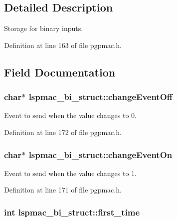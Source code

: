 \subsection{Detailed Description}
Storage for binary inputs. 

Definition at line 163 of file pgpmac.\-h.



\subsection{Field Documentation}
\hypertarget{structlspmac__bi__struct_ae0859842f637694ace0e6d54c0e2af6a}{
\subsubsection[{change\-Event\-Off}]{\setlength{\rightskip}{0pt plus 5cm}char$\ast$ lspmac\-\_\-bi\-\_\-struct\-::change\-Event\-Off}}\label{structlspmac__bi__struct_ae0859842f637694ace0e6d54c0e2af6a}


Event to send when the value changes to 0. 



Definition at line 172 of file pgpmac.\-h.

\hypertarget{structlspmac__bi__struct_ae7178007dfdf21be0e5b1fbaa36732af}{
\subsubsection[{change\-Event\-On}]{\setlength{\rightskip}{0pt plus 5cm}char$\ast$ lspmac\-\_\-bi\-\_\-struct\-::change\-Event\-On}}\label{structlspmac__bi__struct_ae7178007dfdf21be0e5b1fbaa36732af}


Event to send when the value changes to 1. 



Definition at line 171 of file pgpmac.\-h.

\hypertarget{structlspmac__bi__struct_a814978c33dc99e7911faa4ddb12bfd90}{
\subsubsection[{first\-\_\-time}]{\setlength{\rightskip}{0pt plus 5cm}int lspmac\-\_\-bi\-\_\-struct\-::first\-\_\-time}}\label{structlspmac__bi__struct_a814978c33dc99e7911faa4ddb12bfd90}


